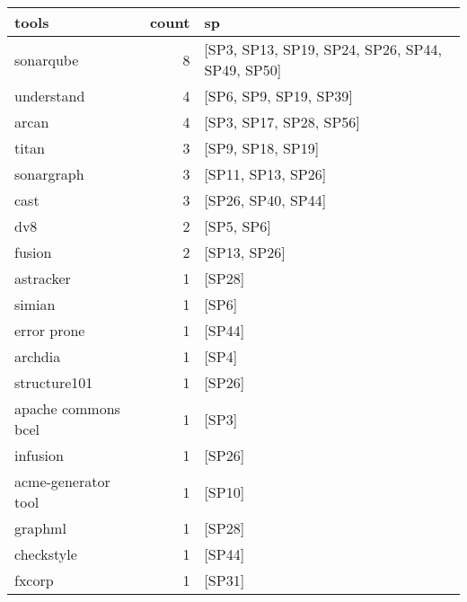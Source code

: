 \begin{tabular}{lrl}
\toprule
               tools &  count &                                                     sp \\
\midrule
           sonarqube &      8 &        [SP3, SP13, SP19, SP24, SP26, SP44, SP49, SP50] \\
          understand &      4 &                                 [SP6, SP9, SP19, SP39] \\
               arcan &      4 &                                [SP3, SP17, SP28, SP56] \\
               titan &      3 &                                      [SP9, SP18, SP19] \\
          sonargraph &      3 &                                     [SP11, SP13, SP26] \\
                cast &      3 &                                     [SP26, SP40, SP44] \\
                 dv8 &      2 &                                             [SP5, SP6] \\
              fusion &      2 &                                           [SP13, SP26] \\
           astracker &      1 &                                                 [SP28] \\
              simian &      1 &                                                  [SP6] \\
         error prone &      1 &                                                 [SP44] \\
             archdia &      1 &                                                  [SP4] \\
        structure101 &      1 &                                                 [SP26] \\
 apache commons bcel &      1 &                                                  [SP3] \\
            infusion &      1 &                                                 [SP26] \\
 acme-generator tool &      1 &                                                 [SP10] \\
             graphml &      1 &                                                 [SP28] \\
          checkstyle &      1 &                                                 [SP44] \\
              fxcorp &      1 &                                                 [SP31] \\

\end{tabular}
